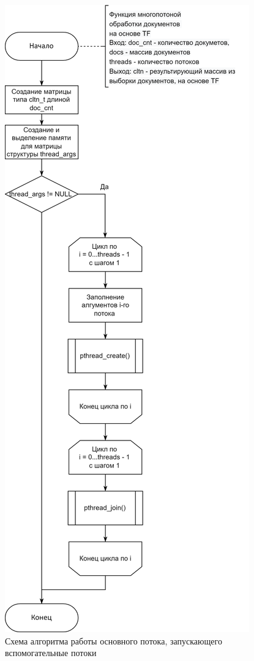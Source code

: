 \begin{figure}[h]
	\centering
	\includegraphics[height=0.85\textheight]{img/parallel.png}
	\caption{Схема алгоритма работы основного потока, запускающего вспомогательные потоки}
	\label{fig:parallel}
\end{figure}

